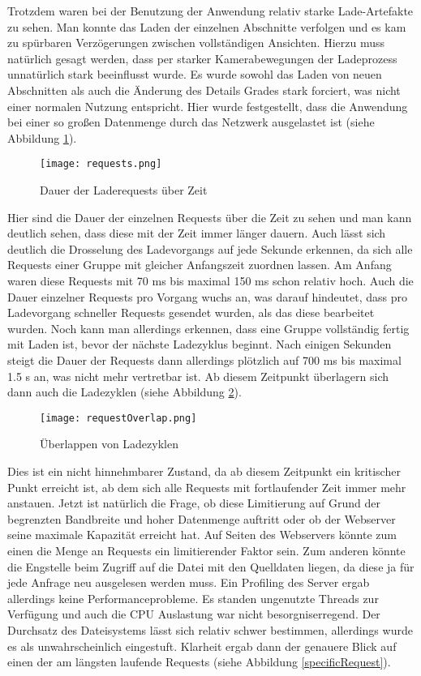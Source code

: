 Trotzdem waren bei der Benutzung der Anwendung relativ starke Lade-Artefakte zu sehen. Man konnte das Laden der einzelnen Abschnitte verfolgen und es kam zu spürbaren Verzögerungen zwischen vollständigen Ansichten. Hierzu muss natürlich gesagt werden, dass per starker Kamerabewegungen der Ladeprozess unnatürlich stark beeinflusst wurde. Es wurde sowohl das Laden von neuen Abschnitten als auch die Änderung des Details Grades stark forciert, was nicht einer normalen Nutzung entspricht. Hier wurde festgestellt, dass die Anwendung bei einer so großen Datenmenge durch das Netzwerk ausgelastet ist (siehe Abbildung \ref{requests}).

\begin{figure}[H]
  \texttt{[image: requests.png]}
  \caption{Dauer der Laderequests über Zeit}
  \label{requests}
\end{figure}

Hier sind die Dauer der einzelnen Requests über die Zeit zu sehen und man kann deutlich sehen, dass diese mit der Zeit immer länger dauern. Auch lässt sich deutlich die Drosselung des Ladevorgangs auf jede Sekunde erkennen, da sich alle Requests einer Gruppe mit gleicher Anfangszeit zuordnen lassen. Am Anfang waren diese Requests mit 70 ms bis maximal 150 ms schon relativ hoch. Auch die Dauer einzelner Requests pro Vorgang wuchs an, was darauf hindeutet, dass pro Ladevorgang schneller Requests gesendet wurden, als das diese bearbeitet wurden. Noch kann man allerdings erkennen, dass eine Gruppe vollständig fertig mit Laden ist, bevor der nächste Ladezyklus beginnt. Nach einigen Sekunden steigt die Dauer der Requests dann allerdings plötzlich auf 700 ms bis maximal 1.5 s an, was nicht mehr vertretbar ist. Ab diesem Zeitpunkt überlagern sich dann auch die Ladezyklen (siehe Abbildung \ref{requestOverlap}). 

\begin{figure}[H]
  \texttt{[image: requestOverlap.png]}
  \caption{Überlappen von Ladezyklen}
  \label{requestOverlap}
\end{figure}

Dies ist ein nicht hinnehmbarer Zustand, da ab diesem Zeitpunkt ein kritischer Punkt erreicht ist, ab dem sich alle Requests mit fortlaufender Zeit immer mehr anstauen. Jetzt ist natürlich die Frage, ob diese Limitierung auf Grund der begrenzten Bandbreite und hoher Datenmenge auftritt oder ob der Webserver seine maximale Kapazität erreicht hat. Auf Seiten des Webservers könnte zum einen die Menge an Requests ein limitierender Faktor sein. Zum anderen könnte die Engstelle beim Zugriff auf die Datei mit den Quelldaten liegen, da diese ja für jede Anfrage neu ausgelesen werden muss. Ein Profiling des Server ergab allerdings keine Performanceprobleme. Es standen ungenutzte Threads zur Verfügung und auch die CPU Auslastung war nicht besorgniserregend. Der Durchsatz des Dateisystems lässt sich relativ schwer bestimmen, allerdings wurde es als unwahrscheinlich eingestuft. Klarheit ergab dann der genauere Blick auf einen der am längsten laufende Requests (siehe Abbildung \ref{specificRequest}).

